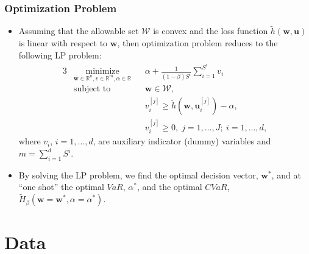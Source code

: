 \documentclass[pdf,10pt,xcolor=dvipsnames,hide notes]{beamer}
\begin{document}
\begin{frame}[label=frame3f]
	\frametitle{Optimization Problem}
	
	\begin{itemize}
		\setlength{\parskip}{15pt}
		\justifying
		
		\item Assuming that the allowable set $\mathcal{W}$ is convex and the loss
		function $\widetilde{h}\left( \mathbf{w,u}\right) $ is linear with respect to $\mathbf{w}$, then optimization problem
		reduces to the following LP problem:%
	\begin{alignat}{3}
	& \underset{\mathbf{w}\in
		\mathbb{R}^{n},v\in
		\mathbb{R}^{m},\alpha \in
		\mathbb{R}}{\text{minimize}}
	& & \alpha +\frac{1}{\left( 1-\beta \right)  S^{i}}\sum_{i=1}^{S^{i}}v_{i}
	\\ 
	& \text{subject to} 
	& & \mathbf{w}\in \mathcal{W},\\
	&&& v_{i}^{\left[ j\right] }\geq \widetilde{h}(\mathbf{w},\mathbf{u}_{i}^{[j]})-\alpha , \\
	&&&v_{i}^{\left[ j\right] }\geq 0, \; j = 1, \ldots, J; \ i = 1, \ldots, d,
	\end{alignat}
	where $v_{i}$, $i = 1, \ldots, d$, are auxiliary indicator (dummy) variables and $m=\sum_{i=1}^{d}S^{i}$. 

	\item By solving the LP problem, we find the optimal
	decision vector, $\mathbf{w}^{\ast }$, and at ``one shot'' the optimal $VaR$, $
		\alpha ^{\ast }$, and the optimal $CVaR$, \footnotesize $\widetilde{H}_{\beta }\left(	\mathbf{w}=\mathbf{w}^{\ast },\alpha =\alpha ^{\ast }\right) $.
		
	
		\end{itemize}
\end{frame}


\section{Data}
\end{document}
